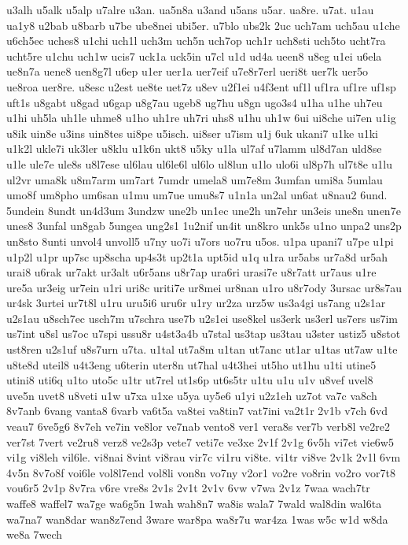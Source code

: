 {u3alh
u5alk
u5alp
u7alre
u3an.
ua5n8a
u3and
u5ans
u5ar.
ua8re.
u7at.
u1au
ua1y8
u2bab
u8barb
u7be
ube8nei
ubi5er.
u7blo
ubs2k
2uc
uch7am
uch5au
u1che
u6ch5ec
uches8
u1chi
uch1l
uch3m
uch5n
uch7op
uch1r
uch8sti
uch5to
ucht7ra
ucht5re
u1chu
uch1w
ucis7
uck1a
uck5in
u7cl
u1d
ud4a
ueen8
u8eg
u1ei
u6ela
ue8n7a
uene8
uen8g7l
u6ep
u1er
uer1a
uer7eif
u7e8r7erl
ueri8t
uer7k
uer5o
ue8roa
uer8re.
u8esc
u2est
ue8te
uet7z
u8ev
u2f1ei
u4f3ent
uf1l
uf1ra
uf1re
uf1sp
uft1s
u8gabt
u8gad
u6gap
u8g7au
ugeb8
ug7hu
u8gn
ugo3s4
u1ha
u1he
uh7eu
u1hi
uh5la
uh1le
uhme8
u1ho
uh1re
uh7ri
uhs8
u1hu
uh1w
6ui
ui8che
ui7en
u1ig
u8ik
uin8e
u3ins
uin8tes
ui8pe
u5isch.
ui8ser
u7ism
u1j
6uk
ukani7
u1ke
u1ki
u1k2l
ukle7i
uk3ler
u8klu
u1k6n
ukt8
u5ky
u1la
ul7af
u7lamm
ul8d7an
uld8se
u1le
ule7e
ule8s
u8l7ese
ul6lau
ul6le6l
ul6lo
ul8lun
u1lo
ulo6i
ul8p7h
ul7t8e
u1lu
ul2vr
uma8k
u8m7arm
um7art
7umdr
umela8
um7e8m
3umfan
umi8a
5umlau
umo8f
um8pho
um6san
u1mu
um7ue
umu8s7
u1n1a
un2al
un6at
u8nau2
6und.
5undein
8undt
un4d3um
3undzw
une2b
un1ec
une2h
un7ehr
un3eis
une8n
unen7e
unes8
3unfal
un8gab
5ungea
ung2s1
1u2nif
un4it
un8kro
unk5s
u1no
unpa2
uns2p
un8sto
8unti
unvol4
unvoll5
u7ny
uo7i
u7ors
uo7ru
u5os.
u1pa
upani7
u7pe
u1pi
u1p2l
u1pr
up7sc
up8scha
up4s3t
up2t1a
upt5id
u1q
u1ra
ur5abs
ur7a8d
ur5ah
urai8
u6rak
ur7akt
ur3alt
u6r5ans
u8r7ap
ura6ri
urasi7e
u8r7att
ur7aus
u1re
ure5a
ur3eig
ur7ein
u1ri
uri8c
uriti7e
ur8mei
ur8nan
u1ro
u8r7ody
3ursac
ur8s7au
ur4sk
3urtei
ur7t8l
u1ru
uru5i6
uru6r
u1ry
ur2za
urz5w
us3a4gi
us7ang
u2s1ar
u2s1au
u8sch7ec
usch7m
u7schra
use7b
u2s1ei
use8kel
us3erk
us3erl
us7ers
us7im
us7int
u8sl
us7oc
u7spi
ussu8r
u4st3a4b
u7stal
us3tap
us3tau
u3ster
ustiz5
u8stot
ust8ren
u2s1uf
u8s7urn
u7ta.
u1tal
ut7a8m
u1tan
ut7anc
ut1ar
u1tas
ut7aw
u1te
u8te8d
uteil8
u4t3eng
u6terin
uter8n
ut7hal
u4t3hei
ut5ho
ut1hu
u1ti
utine5
utini8
uti6q
u1to
uto5c
u1tr
ut7rel
ut1s6p
ut6s5tr
u1tu
u1u
u1v
u8vef
uvel8
uve5n
uvet8
u8veti
u1w
u7xa
u1xe
u5ya
uy5e6
u1yi
u2z1eh
uz7ot
va7c
va8ch
8v7anb
6vang
vanta8
6varb
va6t5a
va8tei
va8tin7
vat7ini
va2t1r
2v1b
v7ch
6vd
veau7
6ve5g6
8v7eh
ve7in
ve8lor
ve7nab
vento8
ver1
vera8s
ver7b
verb8l
ve2re2
ver7st
7vert
ve2ru8
verz8
ve2s3p
vete7
veti7e
ve3xe
2v1f
2v1g
6v5h
vi7et
vie6w5
vi1g
vi8leh
vil6le.
vi8nai
8vint
vi8rau
vir7c
vi1ru
vi8te.
vi1tr
vi8ve
2v1k
2v1l
6vm
4v5n
8v7o8f
voi6le
vol8l7end
vol8li
von8n
vo7ny
v2or1
vo2re
vo8rin
vo2ro
vor7t8
vou6r5
2v1p
8v7ra
v6re
vre8s
2v1s
2v1t
2v1v
6vw
v7wa
2v1z
7waa
wach7tr
waffe8
waffel7
wa7ge
wa6g5n
1wah
wah8n7
wa8is
wala7
7wald
wal8din
wal6ta
wa7na7
wan8dar
wan8z7end
3ware
war8pa
wa8r7u
war4za
1was
w5c
w1d
w8da
we8a
7wech
}
